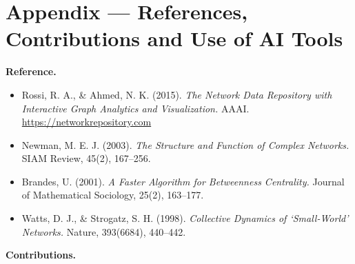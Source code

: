 \newpage
\section*{Appendix — References, Contributions and Use of AI Tools}

\vspace{0.5cm}

\textbf{Reference.} 

\begin{itemize}
    \item Rossi, R. A., \& Ahmed, N. K. (2015). \textit{The Network Data Repository with Interactive Graph Analytics and Visualization.} AAAI. \url{https://networkrepository.com}
    \item Newman, M. E. J. (2003). \textit{The Structure and Function of Complex Networks.} SIAM Review, 45(2), 167–256.
    \item Brandes, U. (2001). \textit{A Faster Algorithm for Betweenness Centrality.} Journal of Mathematical Sociology, 25(2), 163–177.
    \item Watts, D. J., \& Strogatz, S. H. (1998). \textit{Collective Dynamics of ‘Small-World’ Networks.} Nature, 393(6684), 440–442.
\end{itemize}

\vspace{0.5cm}

\textbf{Contributions.}  

